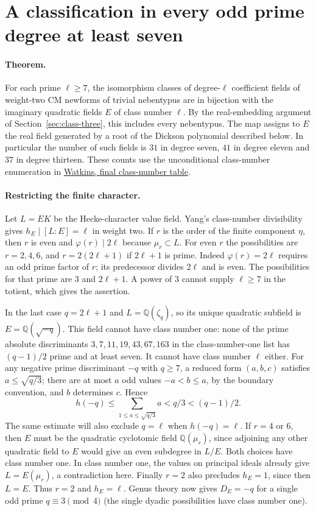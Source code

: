 \section{A classification in every odd prime degree at least seven}
\label{sec:oddprime}

\paragraph{Theorem.}
For each prime $\ell\ge7$, the isomorphism classes of degree-$\ell$ coefficient fields of weight-two CM newforms of trivial nebentypus are in bijection with the imaginary quadratic fields $E$ of class number $\ell$. By the real-embedding argument of Section~\ref{sec:class-three}, this includes every nebentypus. The map assigns to $E$ the real field generated by a root of the Dickson polynomial described below. In particular the number of such fields is $31$ in degree seven, $41$ in degree eleven and $37$ in degree thirteen. These counts use the unconditional class-number enumeration in \href{https://magma.maths.usyd.edu.au/~watkins/papers/smallcn.pdf}{Watkins, final class-number table}.

\paragraph{Restricting the finite character.}
Let $L=EK$ be the Hecke-character value field. Yang's class-number divisibility gives $h_E\mid[L:E]=\ell$ in weight two. If $r$ is the order of the finite component $\eta$, then $r$ is even and $\varphi(r)\mid 2\ell$ because $\mu_r\subset L$. For even $r$ the possibilities are $r=2,4,6$, and $r=2(2\ell+1)$ if $2\ell+1$ is prime. Indeed $\varphi(r)=2\ell$ requires an odd prime factor of $r$; its predecessor divides $2\ell$ and is even. The possibilities for that prime are $3$ and $2\ell+1$. A power of $3$ cannot supply $\ell\ge7$ in the totient, which gives the assertion.

In the last case $q=2\ell+1$ and $L=\mathbb Q(\zeta_q)$, so its unique quadratic subfield is $E=\mathbb Q(\sqrt{-q})$. This field cannot have class number one: none of the prime absolute discriminants $3,7,11,19,43,67,163$ in the class-number-one list has $(q-1)/2$ prime and at least seven. It cannot have class number $\ell$ either. For any negative prime discriminant $-q$ with $q\ge7$, a reduced form $(a,b,c)$ satisfies $a\le\sqrt{q/3}$; there are at most $a$ odd values $-a<b\le a$, by the boundary convention, and $b$ determines $c$. Hence
\[
             h(-q)\le\sum_{1\le a\le\sqrt{q/3}}a
                     <q/3<(q-1)/2.
\]
The same estimate will also exclude $q=\ell$ when $h(-q)=\ell$. If $r=4$ or $6$, then $E$ must be the quadratic cyclotomic field $\mathbb Q(\mu_r)$, since adjoining any other quadratic field to $E$ would give an even subdegree in $L/E$. Both choices have class number one. In class number one, the values on principal ideals already give $L=E(\mu_r)$, a contradiction here. Finally $r=2$ also precludes $h_E=1$, since then $L=E$. Thus $r=2$ and $h_E=\ell$. Genus theory now gives $D_E=-q$ for a single odd prime $q\equiv3\pmod4$ (the single dyadic possibilities have class number one).

